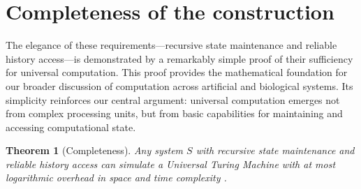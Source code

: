 \documentclass[12pt]{article}
\newtheorem{theorem}{Theorem}
\begin{document}
\section{Completeness of the construction}

The elegance of these requirements---recursive state maintenance and reliable history access---is demonstrated by a remarkably simple proof of their sufficiency for universal computation.
This proof provides the mathematical foundation for our broader discussion of computation across artificial and biological systems.
Its simplicity reinforces our central argument: universal computation emerges not from complex processing units, but from basic capabilities for maintaining and accessing computational state.

\vspace{1em}

\begin{theorem}[Completeness]
Any system $S$ with recursive state maintenance and reliable history access can simulate a Universal Turing Machine with at most logarithmic overhead in space and time complexity \cite{boyle2024memory,liskiewicz1994complexity}.
\end{theorem}
\end{document}
